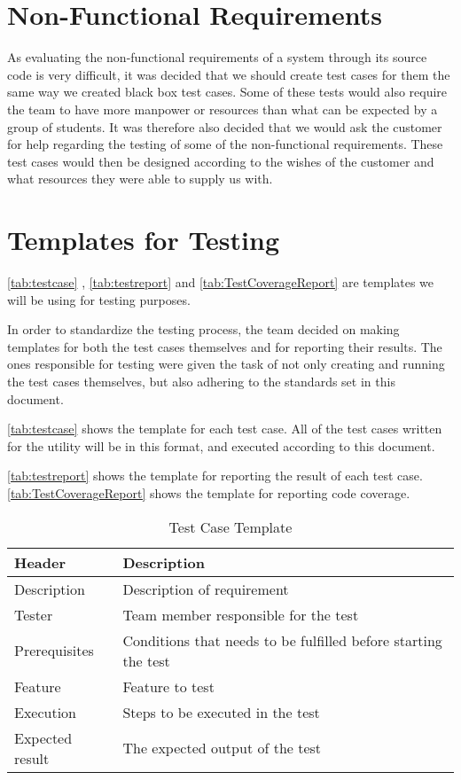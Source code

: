 \section{Non-Functional Requirements}
As evaluating the non-functional requirements of a system through its source code is very difficult, it was decided that we should create test cases for them the same way we created black box test cases. Some of these tests would also require the team to have more manpower or resources than what can be expected by a group of students. It was therefore also decided that we would ask the customer for help regarding the testing of some of the non-functional requirements. These test cases would then be designed according to the wishes of the customer and what resources they were able to supply us with.

\section{Templates for Testing}
\autoref{tab:testcase} , \autoref{tab:testreport} and \autoref{tab:TestCoverageReport} are templates we will be
using for testing purposes.

In order to standardize the testing process, the team decided on making templates for both the test cases themselves and for reporting their results. The ones responsible for testing were given the task of not only creating and running the test cases themselves, but also adhering to the standards set in this document.

\autoref{tab:testcase} shows the template for each test case. All of the test cases written for the \gls{utility} will be in this format, and executed according to this document. 

\autoref{tab:testreport} shows the template for reporting the result of each test case. \autoref{tab:TestCoverageReport} shows the template for reporting code coverage.

\begin{table}[htbp] \footnotesize \center
\caption{Test Case Template \label{tab:testcase}}
\begin{tabular}{l l}
	\toprule
	Header & Description \\
	\midrule
	Description & Description of requirement \\
	Tester & Team member responsible for the test \\
	Prerequisites & Conditions that needs to be fulfilled before starting the test \\
	Feature & Feature to test \\
	Execution & Steps to be executed in the test \\
	Expected result & The expected output of the test \\
	\bottomrule
\end{tabular}
\end{table}

